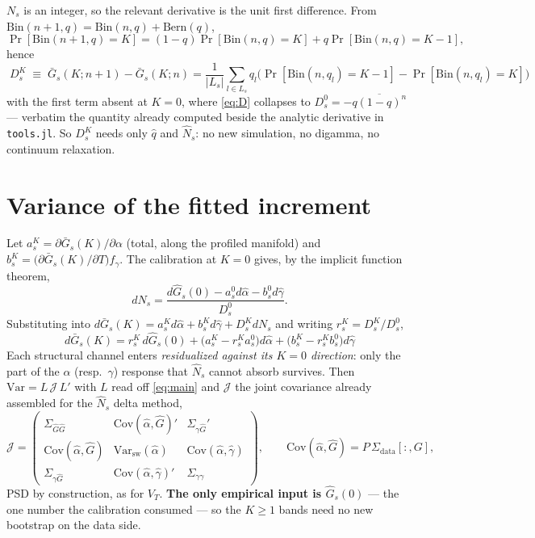 \documentclass[11pt]{article}
\newcommand{\Gbar}{\bar{G}}
\newcommand{\Ghat}{\hat{G}}
\newcommand{\ahat}{\hat{\alpha}}
\newcommand{\ghat}{\hat{\gamma}}
\newcommand{\Nhat}{\hat{N}}
\newcommand{\qhat}{\hat{q}}
\begin{document}
$N_s$ is an integer, so the relevant derivative is the unit first difference. From
$\mathrm{Bin}(n+1,q)=\mathrm{Bin}(n,q)+\mathrm{Bern}(q)$,
\begin{equation}
\Pr[\mathrm{Bin}(n+1,q)=K]=(1-q)\Pr[\mathrm{Bin}(n,q)=K]+q\Pr[\mathrm{Bin}(n,q)=K-1],
\end{equation}
hence
\begin{equation}
\boxed{\;
D_s^{K}\;\equiv\;\Gbar_s(K;n+1)-\Gbar_s(K;n)
=\frac{1}{|L_s|}\sum_{l\in L_s} q_l\Big(\Pr[\mathrm{Bin}(n,q_l)=K-1]-\Pr[\mathrm{Bin}(n,q_l)=K]\Big)\;}
\label{eq:D}
\end{equation}
with the first term absent at $K=0$, where \eqref{eq:D} collapses to
$D_s^{0}=-\overline{q(1-q)^{n}}$ --- verbatim the quantity already computed beside the
analytic derivative in \texttt{tools.jl}. So $D_s^{K}$ needs only $\qhat$ and $\Nhat_s$: no
new simulation, no digamma, no continuum relaxation.

\section{Variance of the fitted increment}

Let $a_s^{K}=\partial\Gbar_s(K)/\partial\alpha$ (total, along the profiled manifold) and
$b_s^{K}=\big(\partial\Gbar_s(K)/\partial T\big)f_\gamma$. The calibration at $K=0$ gives, by
the implicit function theorem,
\begin{equation}
dN_s=\frac{d\Ghat_s(0)-a_s^{0}d\ahat-b_s^{0}d\ghat}{D_s^{0}} .
\end{equation}
Substituting into $d\Gbar_s(K)=a_s^{K}d\ahat+b_s^{K}d\ghat+D_s^{K}dN_s$ and writing
$r_s^{K}=D_s^{K}/D_s^{0}$,
\begin{equation}
\boxed{\;
d\Gbar_s(K)=r_s^{K}\,d\Ghat_s(0)
+\big(a_s^{K}-r_s^{K}a_s^{0}\big)d\ahat
+\big(b_s^{K}-r_s^{K}b_s^{0}\big)d\ghat \;}
\label{eq:main}
\end{equation}
Each structural channel enters \emph{residualized against its $K=0$ direction}: only the part
of the $\alpha$ (resp.\ $\gamma$) response that $\Nhat_s$ cannot absorb survives. Then
$\mathrm{Var}=L\,\mathcal{J}\,L'$ with $L$ read off \eqref{eq:main} and $\mathcal{J}$ the joint
covariance already assembled for the $\Nhat_s$ delta method,
\begin{equation}
\mathcal{J}=
\begin{pmatrix}
\Sigma_{\Ghat\Ghat} & \mathrm{Cov}(\ahat,\Ghat)' & \Sigma_{\gamma\Ghat}'\\
\mathrm{Cov}(\ahat,\Ghat) & \mathrm{Var}_{\mathrm{sw}}(\ahat) & \mathrm{Cov}(\ahat,\ghat)\\
\Sigma_{\gamma\Ghat} & \mathrm{Cov}(\ahat,\ghat)' & \Sigma_{\gamma\gamma}
\end{pmatrix},
\qquad
\mathrm{Cov}(\ahat,\Ghat)=P\,\Sigma_{\mathrm{data}}[:,G],
\end{equation}
PSD by construction, as for $V_T$. \textbf{The only empirical input is $\Ghat_s(0)$} --- the
one number the calibration consumed --- so the $K\ge1$ bands need no new bootstrap on the data
side.
\end{document}

